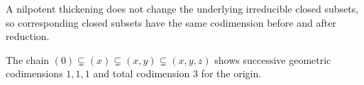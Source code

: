 \begin{example}\label{ex:vi31-19}
A nilpotent thickening does not change the underlying irreducible closed subsets, so corresponding closed subsets have the same codimension before and after reduction.
\end{example}

\begin{example}\label{ex:vi31-20}
The chain $(0)\subsetneq(x)\subsetneq(x,y)\subsetneq(x,y,z)$ shows successive geometric codimensions $1,1,1$ and total codimension $3$ for the origin.
\end{example}
